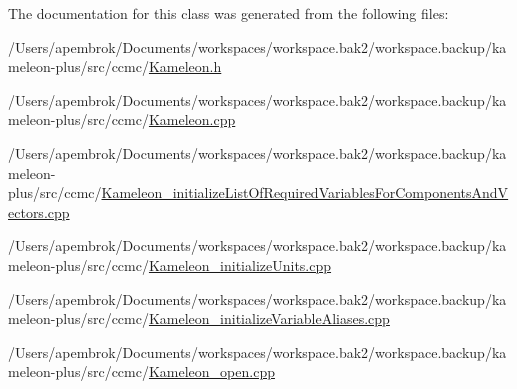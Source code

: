 The documentation for this class was generated from the following files\-:\begin{DoxyCompactItemize}
\item 
/\-Users/apembrok/\-Documents/workspaces/workspace.\-bak2/workspace.\-backup/kameleon-\/plus/src/ccmc/\hyperlink{_kameleon_8h}{Kameleon.\-h}\item 
/\-Users/apembrok/\-Documents/workspaces/workspace.\-bak2/workspace.\-backup/kameleon-\/plus/src/ccmc/\hyperlink{_kameleon_8cpp}{Kameleon.\-cpp}\item 
/\-Users/apembrok/\-Documents/workspaces/workspace.\-bak2/workspace.\-backup/kameleon-\/plus/src/ccmc/\hyperlink{_kameleon__initialize_list_of_required_variables_for_components_and_vectors_8cpp}{Kameleon\-\_\-initialize\-List\-Of\-Required\-Variables\-For\-Components\-And\-Vectors.\-cpp}\item 
/\-Users/apembrok/\-Documents/workspaces/workspace.\-bak2/workspace.\-backup/kameleon-\/plus/src/ccmc/\hyperlink{_kameleon__initialize_units_8cpp}{Kameleon\-\_\-initialize\-Units.\-cpp}\item 
/\-Users/apembrok/\-Documents/workspaces/workspace.\-bak2/workspace.\-backup/kameleon-\/plus/src/ccmc/\hyperlink{_kameleon__initialize_variable_aliases_8cpp}{Kameleon\-\_\-initialize\-Variable\-Aliases.\-cpp}\item 
/\-Users/apembrok/\-Documents/workspaces/workspace.\-bak2/workspace.\-backup/kameleon-\/plus/src/ccmc/\hyperlink{_kameleon__open_8cpp}{Kameleon\-\_\-open.\-cpp}\end{DoxyCompactItemize}
